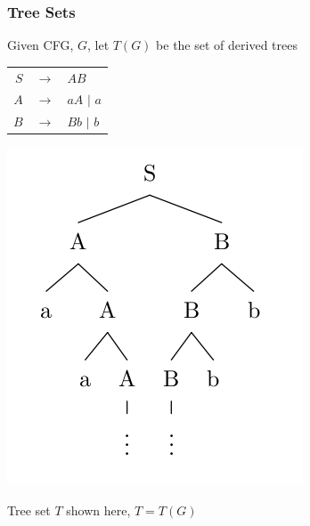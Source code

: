 \documentclass[compress,color=usenames]{beamer}
\begin{document}
\begin{frame}
\frametitle{Tree Sets} 

Given CFG, $G$, let $T(G)$ be the set of derived trees

\begin{center}
\begin{tabular}{rcl}
$S$ & $\rightarrow$ & $AB$\\
$A$ & $\rightarrow$ & $aA$ $\mid$ $a$\\
$B$ & $\rightarrow$ & $Bb$ $\mid$ $b$
\end{tabular}
\end{center}

\begin{center}
\includegraphics[scale=.3]{pics/pic2-3.jpg}
\end{center}


Tree set $T$ shown here, $T = T(G)$
\end{frame}
\end{document}
